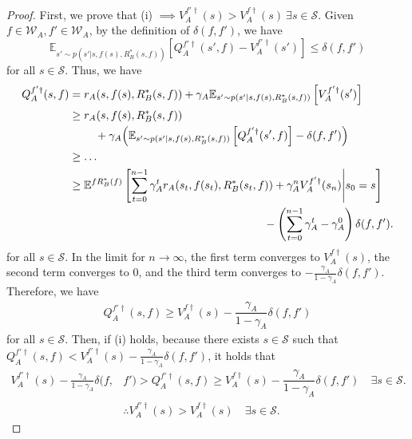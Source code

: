 \documentclass{acml}
\providecommand{\E}{\mathbb{E}} %
\begin{document}
\begin{proof}
	First, we prove that (i) $\implies V_A^{f'\dag}(s)>V_A^{f\dag}(s)~\exists s\in\mathcal{S}$.
	Given $f\in\mathcal{W}_A, f'\in\mathcal{W}_A$, by the definition of $\delta(f,f')$, we have
	\begin{equation}
		\E_{s'\sim p(s'|s,f(s),R_B^*(s,f))}\left[ Q_A^{f'\dag}(s',f)-V_A^{f'\dag}(s') \right] \le \delta(f,f')
	\end{equation}
	for all $s\in\mathcal{S}$.
	Thus, we have
	\begin{subequations}
		\begin{align}
			Q_A^{f'\dag}(s,f)&=r_A(s,f(s),R_B^*(s,f))+\gamma_A\E_{s'\sim p(s'|s,f(s),R_B^*(s,f))}\left[ V_A^{f'\dag}(s') \right]\\
			&\ge\begin{multlined}[t]
			    r_A(s,f(s),R_B^*(s,f))\\+\gamma_A\Bigl(\E_{s'\sim p(s'|s,f(s),R_B^*(s,f))}\left[ Q_A^{f'\dag}(s',f) \right]-\delta(f,f')\Bigl)
			\end{multlined}\\
			&\ge\dots\nonumber\\
			&\ge\begin{multlined}[t]
                    \E^{fR_B^*(f)}\left[ \sum_{t=0}^{n-1} \gamma_A^t r_A(s_t,f(s_t),R_B^*(s_t,f))+\gamma_A^n V_A^{f'\dag}(s_n)\middle| s_0=s\right]\\
    			- \left(\sum_{t=0}^{n-1}\gamma_A^t -\gamma_A^0\right)\delta(f,f').
			\end{multlined}
		\end{align}
	\end{subequations}
	for all $s\in\mathcal{S}$.
	In the limit for $n\to\infty$, the first term converges to $V_A^{f\dag}(s)$, the second term converges to 0, and the third term converges to $-\frac{\gamma_A}{1-\gamma_A}\delta(f,f')$.
	Therefore, we have
	\begin{align}
		Q_A^{f'\dag}(s,f)\ge V_A^{f\dag}(s)-\dfrac{\gamma_A}{1-\gamma_A}\delta(f,f')
	\end{align}
	for all $s\in\mathcal{S}$.
	Then, if (i) holds, because there exists $s\in\mathcal{S}$ such that $Q_A^{f'\dag}(s,f)<V_A^{f'\dag}(s)-\frac{\gamma_A}{1-\gamma_A}\delta(f,f')$, it holds that
	\begin{align}
		V_A^{f'\dag}(s)-\frac{\gamma_A}{1-\gamma_A}\delta(f,&f')>Q_A^{f'\dag}(s,f)\ge V_A^{f\dag}(s)-\dfrac{\gamma_A}{1-\gamma_A}\delta(f,f')\quad\exists s\in\mathcal{S}.\\
		&\therefore V_A^{f'\dag}(s)>V_A^{f\dag}(s)\quad\exists s\in\mathcal{S}.\label{eq:(i)implies}

\end{align}
\end{proof}
\end{document}
